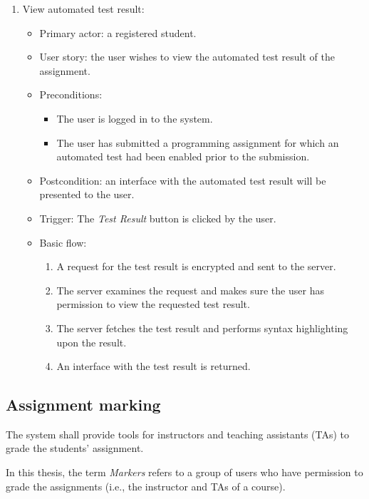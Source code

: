\begin{enumerate}
\item View automated test result:
\begin{itemize}
    \item Primary actor: a registered student.
    \item User story: the user wishes to view the automated test result of the
        assignment.
    \item Preconditions:
        \begin{itemize}
            \item The user is logged in to the system.
            \item The user has submitted a programming assignment for which an
                automated test had been enabled prior to the submission.
        \end{itemize}
    \item Postcondition:
        an interface with the automated test result will be presented to the
        user.
    \item Trigger: The \emph{Test Result} button is clicked by the user.
    \item Basic flow:
        \begin{enumerate}
            \item A request for the test result is encrypted and sent to the
                server.
            \item The server examines the request and makes sure the user has
                permission to view the requested test result.
            \item The server fetches the test result and performs syntax
                highlighting upon the result.
            \item An interface with the test result is returned.
        \end{enumerate}
\end{itemize}
\end{enumerate}

\subsection{Assignment marking}
The system shall provide tools for instructors and teaching assistants (TAs) to
grade the students' assignment.

In this thesis, the term \emph{Markers} refers to a group of users who have
permission to grade the assignments (i.e., the instructor and TAs of a course).

